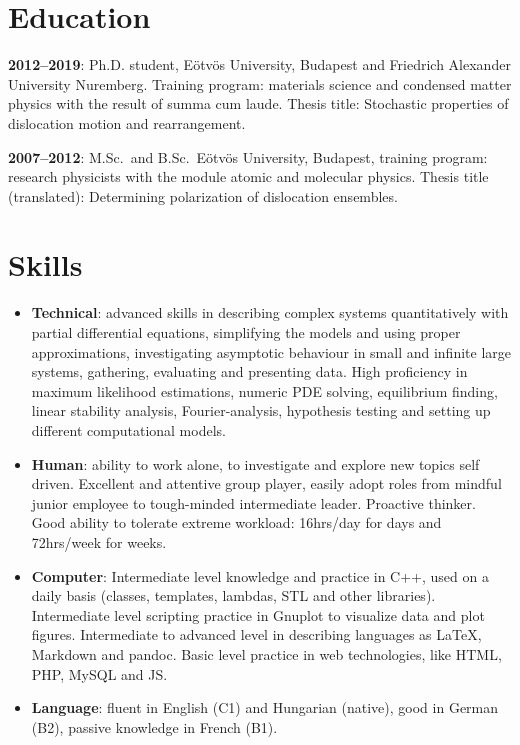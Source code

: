 \documentclass[10pt,a4paper,sans]{moderncv}        %
\begin{document}
\makecvtitle
\section{Education}
\textbf{2012--2019}: Ph.D. student, Eötvös University, Budapest and Friedrich Alexander University Nuremberg. Training program: materials science and condensed matter physics with the result of summa cum laude. Thesis title: Stochastic properties of dislocation motion and rearrangement.  %
\vspace{4pt}

\textbf{2007--2012}: M.Sc.\ and B.Sc.\, Eötvös University, Budapest,  training program: research physicists with the module atomic and molecular physics. Thesis title (translated): Determining polarization of dislocation ensembles.

\section{Skills}
\begin{itemize}
\item \textbf{Technical}: advanced skills in describing complex systems quantitatively with partial differential equations, simplifying the models and using proper approximations, investigating asymptotic behaviour in small and infinite large systems, gathering, evaluating and presenting data. High proficiency in maximum likelihood estimations, numeric PDE solving, equilibrium finding, linear stability analysis, Fourier-analysis, hypothesis testing and setting up different computational models.
\vspace{4pt}
\item \textbf{Human}: ability to work alone, to investigate and explore new topics self driven. Excellent and attentive group player, easily adopt roles from mindful junior employee to tough-minded intermediate leader. Proactive thinker. Good ability to tolerate extreme workload: 16hrs/day for days and 72hrs/week for weeks.
\vspace{4pt}
\item \textbf{Computer}: Intermediate level knowledge and practice in C++, used on a daily basis (classes, templates, lambdas, STL and other libraries). Intermediate level scripting practice in Gnuplot to visualize data and plot figures. Intermediate to advanced level in describing languages as LaTeX, Markdown and pandoc. Basic level practice in web technologies, like HTML, PHP, MySQL and JS.
\vspace{4pt}
\item \textbf{Language}: fluent in English (C1) and Hungarian (native), good in German (B2), passive knowledge in French (B1).
\end{itemize}
\end{document}
